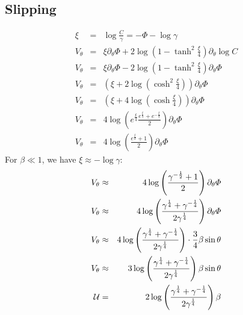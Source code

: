 \subsection{Slipping}
\begin{eqnarray}
  \xi &=& \log \frac{C}{\gamma} = -\varPhi - \log\gamma \\
  V_\theta & = & \xi \partial_\theta \varPhi
  + 2 \log\left(1 - \tanh^2 \frac{\xi}{4}\right) \partial_\theta \log C \\
  V_\theta & = & \xi \partial_\theta \varPhi
  - 2 \log\left(1 - \tanh^2 \frac{\xi}{4}\right) \partial_\theta \varPhi 
  \\ V_\theta & = & \left( \xi + 2 \log\left(\cosh^2 \frac{\xi}{4}\right) \right) \partial_\theta \varPhi
  \\ V_\theta & = & \left( \xi + 4 \log\left(\cosh \frac{\xi}{4}\right) \right) \partial_\theta \varPhi
  \\ V_\theta & = & 4 \log\left(e^\frac{\xi}{4} \frac{ e^\frac{\xi}{4} + e^{-\frac{\xi}{4}} }{2} \right) \partial_\theta \varPhi
  \\ V_\theta & = & 4 \log\left( \frac{ e^\frac{\xi}{2} + 1 }{2} \right) \partial_\theta \varPhi
\end{eqnarray}
For $\beta \ll 1$, we have $\xi \approx -\log\gamma$:
\begin{eqnarray}
  V_\theta & \approx & 4 \log\left( \frac{ \gamma^{-\frac{1}{2}} + 1 }{2} \right) \partial_\theta \varPhi \\
  V_\theta & \approx & 4 \log\left( \frac{ \gamma^{\frac{1}{4}} + \gamma^{-\frac{1}{4}} }{2 \gamma^{\frac{1}{4}}} \right) \partial_\theta \varPhi \\
  V_\theta & \approx & 4 \log\left( \frac{ \gamma^{\frac{1}{4}} + \gamma^{-\frac{1}{4}} }{2 \gamma^{\frac{1}{4}}} \right) \cdot \frac{3}{4} \beta \sin\theta \\
  V_\theta & \approx & 3 \log\left( \frac{ \gamma^{\frac{1}{4}} + \gamma^{-\frac{1}{4}} }{2 \gamma^{\frac{1}{4}}} \right) \beta \sin\theta \\
  \cal{U} &=& 2 \log\left( \frac{ \gamma^{\frac{1}{4}} + \gamma^{-\frac{1}{4}} }{2 \gamma^{\frac{1}{4}}} \right) \beta
  \end{eqnarray}

